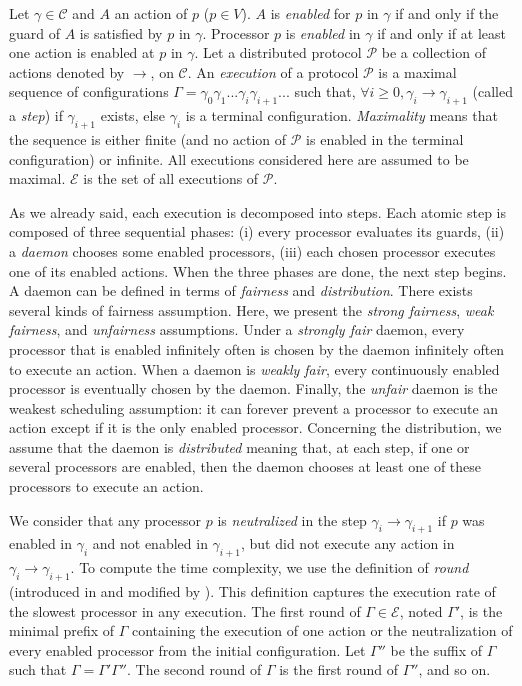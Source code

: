 \documentclass[11pt]{article}
\begin{document}
Let $\gamma\in\mathcal{C}$ and $A$ an action of $p$ ($p\in V$). $A$ is \emph{enabled} for $p$ in $\gamma$ if and only if the guard of $A$ is satisfied by $p$ in $\gamma$. Processor $p$ is \emph{enabled} in $\gamma$ if and only if at least one action is enabled at $p$ in $\gamma$. Let a distributed protocol $\mathcal{P}$ be a collection of actions denoted by $\rightarrow$, on $\mathcal{C}$. An \emph{execution} of a protocol $\mathcal{P}$ is a maximal sequence of configurations $\Gamma=\gamma_{0}\gamma_{1}...\gamma_{i}\gamma_{i+1}...$ such that, $\forall i\geq0,\gamma_{i}\rightarrow\gamma_{i+1}$ (called a \emph{step}) if $\gamma_{i+1}$ exists, else $\gamma_{i}$ is a terminal configuration. \emph{Maximality} means that the sequence is either finite (and no action of $\mathcal{P}$ is enabled in the terminal configuration) or infinite. All executions considered here are assumed to be maximal. $\mathcal{E}$ is the set of all executions of $\mathcal{P}$.

As we already said, each execution is decomposed into steps. Each atomic step is composed of three sequential phases: (i) every processor evaluates its guards, (ii) a \emph{daemon} chooses some enabled processors, (iii) each chosen processor executes one of its enabled actions. When the three phases are done, the next step begins. A daemon can be defined in terms of \emph{fairness} and \emph{distribution}. There exists several kinds of fairness assumption. Here, we present the \emph{strong fairness}, \emph{weak fairness}, and \emph{unfairness} assumptions. Under a \emph{strongly fair} daemon, every processor that is enabled infinitely often is chosen by the daemon infinitely often to execute an action. When a daemon is \emph{weakly fair}, every continuously enabled processor is eventually chosen by the daemon. Finally, the \emph{unfair} daemon is the weakest scheduling assumption: it can forever prevent a processor to execute an action except if it is the only enabled processor. Concerning the distribution, we assume that the daemon is \emph{distributed} meaning that, at each step, if one or several processors are enabled, then the daemon chooses at least one of these processors to execute an action. 

We consider that any processor $p$ is \emph{neutralized} in the step $\gamma_{i}\rightarrow\gamma_{i+1}$ if $p$ was enabled in $\gamma_{i}$ and not enabled in $\gamma_{i+1}$, but did not execute any action in $\gamma_{i}\rightarrow\gamma_{i+1}$. To compute the time complexity, we use the definition of \emph{round} (introduced in \cite{DIM97} and modified by \cite{BDPV07}). This definition captures the execution rate of the slowest processor in any execution. The first round of $\Gamma\in\mathcal{E}$, noted $\Gamma'$, is the minimal prefix of $\Gamma$ containing the execution of one action or the neutralization of every enabled processor from the initial configuration. Let $\Gamma''$ be the suffix of $\Gamma$ such that $\Gamma=\Gamma'\Gamma''$. The second round of $\Gamma$ is the first round of $\Gamma''$, and so on.
\end{document}
